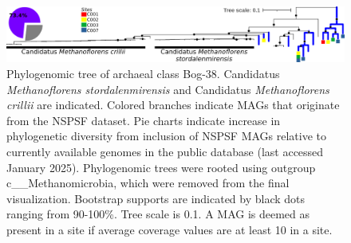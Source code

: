 \begin{figure}[H]
    \vspace{-0.4cm}
    \centering
    \includegraphics[width=\linewidth]{content-images/bog38_invert.png}
    \caption{\scriptsize Phylogenomic tree of archaeal class Bog-38. Candidatus \emph{Methanoflorens stordalenmirensis} and Candidatus \emph{Methanoflorens crillii} are indicated. Colored branches indicate MAGs that originate from the NSPSF dataset. Pie charts indicate increase in phylogenetic diversity from inclusion of NSPSF MAGs relative to currently available genomes in the public database (last accessed  January 2025). Phylogenomic trees were rooted using outgroup c\_\_Methanomicrobia, which were removed from the final visualization. Bootstrap supports are indicated by black dots ranging from 90-100\%. Tree scale is 0.1. A MAG is deemed as present in a site if average coverage values are at least 10 in a site.}
    \label{fig:phylo}
\end{figure}  